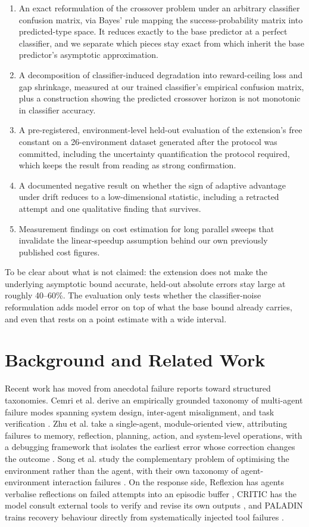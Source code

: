 \documentclass[conference]{IEEEtran}
\begin{document}
\begin{enumerate}
\setlength\itemsep{1pt}
\setlength\parskip{0pt}
\item An exact reformulation of the crossover problem under an arbitrary
classifier confusion matrix, via Bayes' rule mapping the
success-probability matrix into predicted-type space. It reduces exactly
to the base predictor at a perfect classifier, and we separate which
pieces stay exact from which inherit the base predictor's asymptotic
approximation.
\item A decomposition of classifier-induced degradation into
reward-ceiling loss and gap shrinkage, measured at our trained
classifier's empirical confusion matrix, plus a construction showing the
predicted crossover horizon is not monotonic in classifier accuracy.
\item A pre-registered, environment-level held-out evaluation of the
extension's free constant on a 26-environment dataset generated after the
protocol was committed, including the uncertainty quantification the
protocol required, which keeps the result from reading as strong
confirmation.
\item A documented negative result on whether the sign of adaptive
advantage under drift reduces to a low-dimensional statistic, including a
retracted attempt and one qualitative finding that survives.
\item Measurement findings on cost estimation for long parallel sweeps
that invalidate the linear-speedup assumption behind our own previously
published cost figures.
\end{enumerate}

To be clear about what is not claimed: the extension does not make the
underlying asymptotic bound accurate, held-out absolute errors stay large
at roughly 40--60\%. The evaluation only tests whether the
classifier-noise reformulation adds model error on top of what the base
bound already carries, and even that rests on a point estimate with a
wide interval.

\section{Background and Related Work}

Recent work has moved from anecdotal failure reports toward structured
taxonomies. Cemri et al. derive an empirically grounded taxonomy of
multi-agent failure modes spanning system design, inter-agent
misalignment, and task verification \cite{cemri2025}. Zhu et al. take a
single-agent, module-oriented view, attributing failures to memory,
reflection, planning, action, and system-level operations, with a
debugging framework that isolates the earliest error whose correction
changes the outcome \cite{zhu2025}. Song et al. study the complementary
problem of optimising the environment rather than the agent, with their
own taxonomy of agent-environment interaction failures
\cite{song2025aegis}. On the response side, Reflexion has agents
verbalise reflections on failed attempts into an episodic buffer
\cite{shinn2023}, CRITIC has the model consult external tools to verify
and revise its own outputs \cite{gou2024}, and PALADIN trains recovery
behaviour directly from systematically injected tool failures
\cite{vuddanti2025}.
\end{document}
